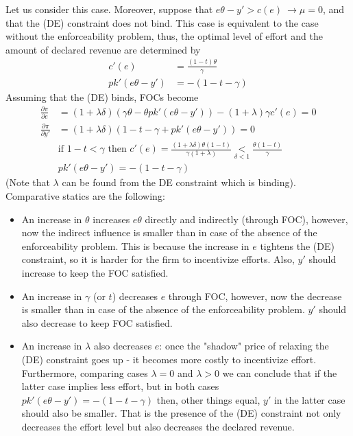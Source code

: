\documentclass[a4paper]{article}
\begin{document}
Let us consider this case. Moreover, suppose that $e \theta - y' > c(e)\ \to \mu = 0$, and that the (DE) constraint does not bind. This case is equivalent to the case without the enforceability problem, thus, the optimal level of effort and the amount of declared revenue are determined by
\begin{align*}
c'(e) &= \frac{(1 - t)\theta}{\gamma}\\
pk'(e\theta - y') &= - (1 - t - \gamma)
\end{align*}
Assuming that the (DE) binds, FOCs become
\begin{align*}
\frac{\partial \pi}{\partial e} &= (1 + \lambda \delta)(\gamma \theta - \theta p k'(e \theta - y')) -(1+ \lambda) \gamma c'(e)= 0\\
\frac{\partial \pi}{\partial y'} &= (1 + \lambda \delta)(1 - t - \gamma+pk'(e\theta - y')) = 0\\
&\text{if }1-t < \gamma \text{ then }c'(e) = \frac{(1+\lambda \delta)\theta(1-t)}{\gamma (1 + \lambda)} \underset{\delta < 1}{<} \frac{\theta(1-t)}{\gamma}\\
&pk'(e \theta - y') = -(1 - t - \gamma)
\end{align*}
(Note that $\lambda$ can be found from the DE constraint which is binding). Comparative statics are the following:
\begin{itemize}
	\item An increase in $\theta$ increases $e \theta$ directly and indirectly (through FOC), however, now the indirect influence is smaller than in case of the absence of the enforceability problem. This is because the increase in $e$ tightens the (DE) constraint, so it is harder for the firm to incentivize efforts. Also, $y'$ should increase to keep the FOC satisfied.
	\item An increase in $\gamma$ (or $t$) decreases $e$ through FOC, however, now the decrease is smaller than in case of the absence of the enforceability problem. $y'$ should also decrease to keep FOC satisfied.
	\item An increase in $\lambda$ also decreases $e$: once the "shadow" price of relaxing the (DE) constraint goes up - it becomes more costly to incentivize effort. Furthermore, comparing cases $\lambda = 0$ and $\lambda > 0$ we can conclude that if the latter case implies less effort, but in both cases $pk'(e\theta - y') = -(1 - t - \gamma)$ then, other things equal, $y'$ in the latter case should also be smaller. That is the presence of the (DE) constraint not only decreases the effort level but also decreases the declared revenue.
\end{itemize}
\end{document}
